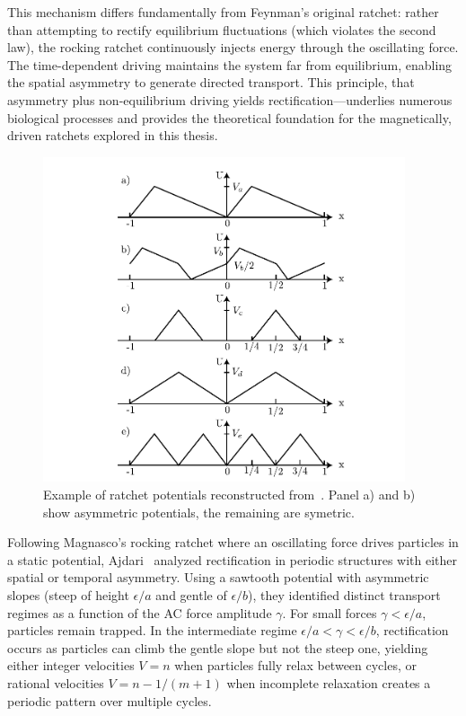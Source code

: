This mechanism differs fundamentally from Feynman's original ratchet: rather than attempting to rectify equilibrium fluctuations (which violates the second law), the rocking ratchet continuously injects energy through the oscillating force. The time-dependent driving maintains the system far from equilibrium, enabling the spatial asymmetry to generate directed transport. This principle, that asymmetry plus non-equilibrium driving yields rectification—underlies numerous biological processes and provides the theoretical foundation for the magnetically, driven ratchets explored in this thesis.

\begin{figure}[h]
  \begin{center}
    \includegraphics[width=0.95\textwidth]{figures/ratchetpotentialexample.pdf}
  \end{center}
  \caption[Ratchet potential examples.]{Example of ratchet potentials reconstructed from~\cite{kanada1999thermal}. Panel a) and b) show asymmetric potentials, the remaining are symetric. }\label{fig:ratchetpotential} %
\end{figure}


Following Magnasco's rocking ratchet where an oscillating force drives particles in a static potential, Ajdari~\cite{ajdari1994rectified} analyzed rectification in periodic structures with either spatial or temporal asymmetry. Using a sawtooth potential with asymmetric slopes (steep of height $\epsilon/a$ and gentle of $\epsilon/b$), they identified distinct transport regimes as a function of the AC force amplitude $\gamma$. 
For small forces $\gamma < \epsilon/a$, particles remain trapped. In the intermediate regime $\epsilon/a < \gamma < \epsilon/b$, rectification occurs as particles can climb the gentle slope but not the steep one, yielding either integer velocities $V = n$ when particles fully relax between cycles, or rational velocities $V = n - 1/(m+1)$ when incomplete relaxation creates a periodic pattern over multiple cycles.


